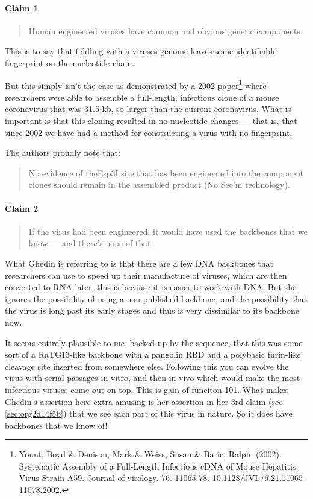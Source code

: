 \documentclass[11pt]{article}
\begin{document}
\paragraph{Claim 1}
\label{sec:orgcd6953c}
\begin{quote}
Human engineered viruses have common and obvious genetic components
\end{quote}
This is to say that fiddling with a viruses genome leaves some identifiable fingerprint on the nucleotide chain.

But this simply isn't the case as demonstrated by a 2002 paper\footnote{Yount, Boyd \& Denison, Mark \& Weiss, Susan \& Baric, Ralph. (2002). Systematic Assembly of a Full-Length Infectious cDNA of Mouse Hepatitis Virus Strain A59. Journal of virology. 76. 11065-78. 10.1128/JVI.76.21.11065-11078.2002.} where researchers were able to assemble a full-length, infectious clone of a mouse coronavirus that was 31.5 kb, so larger than the current coronavirus. What is important is that this cloning resulted in no nucleotide changes --- that is, that since 2002 we have had a method for constructing a virus with no fingerprint.

The authors proudly note that:
\begin{quote}
No evidence of theEsp3I site that has been engineered into the component clones should remain in the assembled product (No See’m technology).
\end{quote}

\paragraph{Claim 2}
\label{sec:org5a106e1}
\begin{quote}
If the virus had been engineered, it would have used the backbones that we know --- and there's none of that
\end{quote}
What Ghedin is referring to is that there are a few DNA backbones that researchers can use to speed up their manufacture of viruses, which are then converted to RNA later, this is because it is easier to work with DNA. But she ignores the possibility of using a non-published backbone, and the possibility that the virus is long past its early stages and thus is very dissimilar to its backbone now.

It seems entirely plausible to me, backed up by the sequence, that this was some sort of a RaTG13-like backbone with a pangolin RBD and a polybasic furin-like cleavage site inserted from somewhere else. Following this you can evolve the virus with serial passages in vitro, and then in vivo which would make the most infectious viruses come out on top. This is gain-of-funciton 101. What makes Ghedin's assertion here extra amusing is her assertion in her 3rd claim (see:  \ref{sec:org2d14f5b}) that we see each part of this virus in nature. So it does have backbones that we know of!
\end{document}
